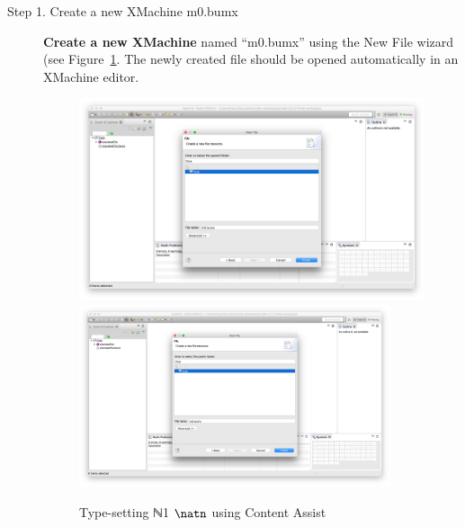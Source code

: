 \begin{description}
\item[Step 1. Create a new XMachine m0.bumx] \textbf{Create a new XMachine} named ``m0.bumx'' using the New File wizard (see Figure~\ref{fig:CreateM0}. The newly created file should be opened automatically in an XMachine editor.
  \begin{figure}[!htbp]
    \centering
    \ifplastex
    \includegraphics[width=512]{figures/CreateM0}
    \else
    \includegraphics[width=0.9\textwidth]{figures/CreateM0}
    \fi
    \caption{Type-setting \ifplastex ℕ1 \else $\natn$ \fi using Content Assist}
    \label{fig:CreateM0}
  \end{figure}


\end{description}
